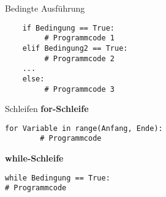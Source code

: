 \begin{frame}[fragile]{Bedingte Ausführung}
	\begin{lstlisting}
	if Bedingung == True:
	     # Programmcode 1
	elif Bedingung2 == True:
	     # Programmcode 2
	...
	else:
	     # Programmcode 3
	\end{lstlisting}
\end{frame}

\begin{frame}[fragile]{Schleifen}
\textbf{for-Schleife}
\begin{lstlisting}
for Variable in range(Anfang, Ende):
		# Programmcode
\end{lstlisting}

\textbf{while-Schleife}
\begin{lstlisting}
while Bedingung == True:
# Programmcode

\end{lstlisting}
\end{frame}
